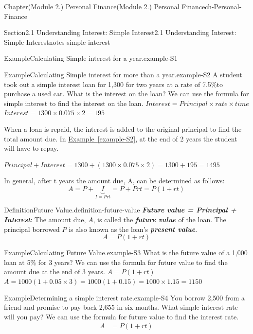 \documentclass[oneside,10pt,]{book}
\newcommand{\xreffont}{\relax}
\newcommand{\alert}[1]{\textbf{\textit{#1}}}
\newcommand{\amp}{&}
\begin{document}
\begin{chapterptx}{Chapter}{(Module 2.) Personal Finance}{}{(Module 2.) Personal Finance}{}{}{ch-Personal-Finance}
\begin{sectionptx}{Section}{2.1 Understanding Interest: Simple Interest}{}{2.1 Understanding Interest: Simple Interest}{}{}{notes-simple-interest}
\begin{example}{Example}{Calculating Simple interest for a year.}{example-S1}
\end{example}
\begin{example}{Example}{Calculating Simple interest for more than a year.}{example-S2}%
A student took out a simple interest loan for \textdollar{}1,300 for two years at a rate of 7.5\%to purchase a used car. What is the interest on the loan?%
\noindent\hypertarget{example-S2-3}{}We can use the formula for simple interest to find the interest on the loan. \(Interest = Principal \times rate \times time\) \(Interest = 1300 \times 0.075 \times 2 = 195\)%
\end{example}
When a loan is repaid, the interest is added to the original principal to find the total amount due. In \hyperref[example-S2]{Example~{\xreffont\ref{example-S2}}}, at the end of 2 years the student will have to repay.%
\par
\(Principal + Interest = 1300 + (1300 \times 0.075 \times 2) = 1300 + 195 = 1495\)%
\par
In general, after t years the amount due, A, can be determined as follows:%
\begin{equation*}
A=P + \underbrace{I}_{I=Prt}=P + Prt=P(1+rt)
\end{equation*}
%
\begin{definition}{Definition}{Future Value.}{definition-future-value}%
\alert{Future value = Principal + Interest}: The amount due, \(A\), is called the \alert{future value} of the loan. The principal borrowed \(P\) is also known as the loan's \alert{present value}.%
\begin{equation*}
A=P(1+rt)
\end{equation*}
%
\end{definition}
\begin{example}{Example}{Calculating Future Value.}{example-S3}%
What is the future value of a \textdollar{}1,000 loan at 5\% for 3 years?%
\noindent\hypertarget{example-S3-3}{}We can use the formula for future value to find the amount due at the end of 3 years. \(A = P(1 + rt)\) \(A = 1000(1 + 0.05 \times 3) = 1000(1 + 0.15) = 1000 \times 1.15 = 1150\)%
\end{example}
\begin{example}{Example}{Determining a simple interest rate.}{example-S4}%
You borrow \textdollar{}2,500 from a friend and promise to pay back \textdollar{}2,655 in six months. What simple interest rate will you pay?%
\noindent\hypertarget{example-S4-3}{}We can use the formula for future value to find the interest rate.%
%
\begin{align*}
A \amp =  P(1 + rt)\\

\end{align*}
\end{example}
\end{sectionptx}
\end{chapterptx}
\end{document}
